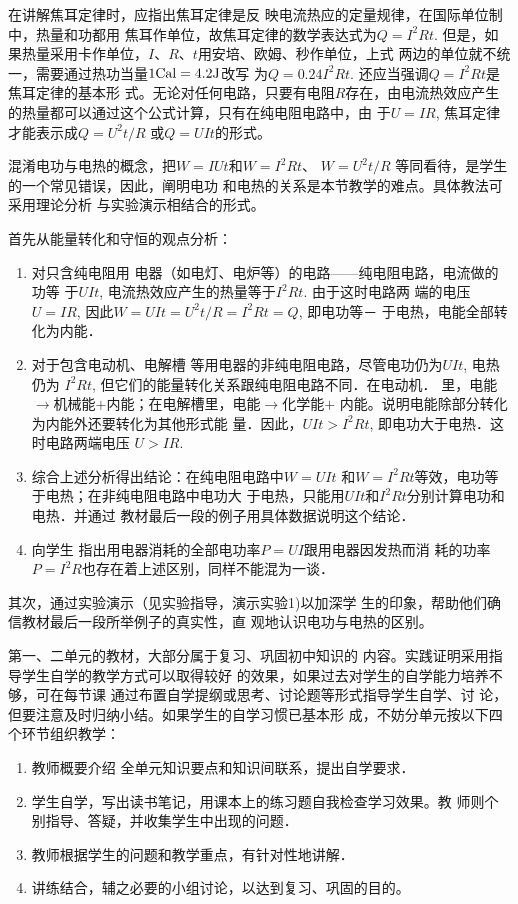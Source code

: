 在讲解焦耳定律时，应指出焦耳定律是反
映电流热应的定量规律，在国际单位制中，热量和功都用
焦耳作单位，故焦耳定律的数学表达式为$Q=I^2Rt$. 但是，如
果热量采用卡作单位，$I$、$R$、$t$用安培、欧姆、秒作单位，上式
两边的单位就不统一，需要通过热功当量$1{\rm Cal}=4.2{\rm J}$改写
为$Q=0.24I^2Rt$. 还应当强调$Q=I^2Rt$是焦耳定律的基本形
式。无论对任何电路，只要有电阻$R$存在，由电流热效应产生
的热量都可以通过这个公式计算，只有在纯电阻电路中，由
于$U=IR$, 焦耳定律才能表示成$Q=U^2t/R$
或$Q=UIt$的形式。

混淆电功与电热的概念，把$W=IUt$和$W=I^2Rt$、
$W=U^2t/R$
等同看待，是学生的一个常见错误，因此，阐明电功
和电热的关系是本节教学的难点。具体教法可采用理论分析
与实验演示相结合的形式。

首先从能量转化和守恒的观点分析：
\begin{enumerate}
\item 对只含纯电阻用
电器（如电灯、电炉等）的电路——纯电阻电路，电流做的功等
于$UIt$, 电流热效应产生的热量等于$I^2Rt$. 由于这时电路两
端的电压$U=IR$, 因此$W=UIt=U^2t/R=I^2Rt=Q$, 即电功等－
于电热，电能全部转化为内能．
\item 对于包含电动机、电解槽
等用电器的非纯电阻电路，尽管电功仍为$UIt$, 电热仍为
$I^2Rt$, 但它们的能量转化关系跟纯电阻电路不同．在电动机．
里，电能$\to $机械能$+$内能；在电解槽里，电能$\to $化学能$+$
内能。说明电能除部分转化为内能外还要转化为其他形式能
量．因此，$UIt>I^2Rt$, 即电功大于电热．这时电路两端电压
$U>IR$.
\item 综合上述分析得出结论：在纯电阻电路中$W=UIt$
和$W=I^2Rt$等效，电功等于电热；在非纯电阻电路中电功大
于电热，只能用$UIt$和$I^2Rt$分别计算电功和电热．并通过
教材最后一段的例子用具体数据说明这个结论．
\item 向学生
指出用电器消耗的全部电功率$P=UI$跟用电器因发热而消
耗的功率$P=I^2R$也存在着上述区别，同样不能混为一谈．
\end{enumerate}

其次，通过实验演示（见实验指导，演示实验1)以加深学
生的印象，帮助他们确信教材最后一段所举例子的真实性，直
观地认识电功与电热的区别。

第一、二单元的教材，大部分属于复习、巩固初中知识的
内容。实践证明采用指导学生自学的教学方式可以取得较好
的效果，如果过去对学生的自学能力培养不够，可在每节课
通过布置自学提纲或思考、讨论题等形式指导学生自学、讨
论，但要注意及时归纳小结。如果学生的自学习惯已基本形
成，不妨分单元按以下四个环节组织教学：
\begin{enumerate}
\item 教师概要介绍
全单元知识要点和知识间联系，提出自学要求．    
\item 学生自学，写出读书笔记，用课本上的练习题自我检查学习效果。教
师则个别指导、答疑，并收集学生中出现的问题．    
\item 教师根据学生的问题和教学重点，有针对性地讲解．    
\item 讲练结合，辅之必要的小组讨论，以达到复习、巩固的目的。
\end{enumerate}


